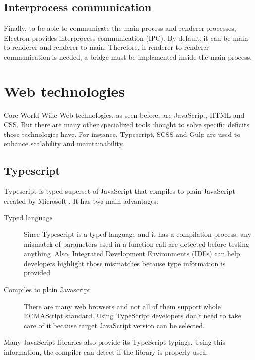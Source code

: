 \subsection{Interprocess communication}

Finally, to be able to communicate the main process and renderer processes, 
Electron provides interprocess communication (IPC). By default, it can be main
to renderer and renderer to main. Therefore, if renderer to renderer 
communication is needed, a bridge must be implemented inside the main process.


\section{Web technologies}

Core World Wide Web technologies, as seen before, are JavaScript, HTML and CSS.
But there are many other specialized tools thought to solve specific deficits 
those technologies have. For instance, Typescript, SCSS and Gulp are used to
enhance scalability and maintainability. 

\subsection{Typescript}

Typescript is typed superset of JavaScript that compiles to plain JavaScript
created by Microsoft \cite{typescript-web}. It has two main advantages:

\begin{description}
	\item[Typed language]
	Since Typescript is a typed language and it has a compilation process, any
	mismatch of parameters used in a function call are detected before testing
	anything. Also, Integrated Development Environments (IDEs) can help
	developers highlight those mismatches because type information is provided.
	
	\item[Compiles to plain Javascript]
	There are many web browsers and not all of them support whole ECMAScript 
	standard. Using TypeScript developers don't need to take care of it because
	target JavaScript version can be selected.

\end{description}

Many JavaScript libraries also provide its TypeScript typings. Using this 
information, the compiler can detect if the library is properly used.


